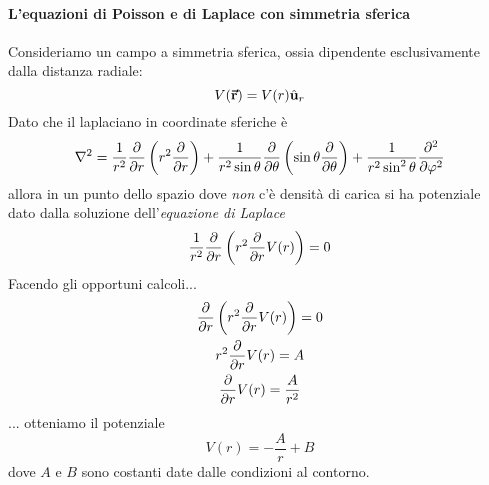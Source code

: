 \paragraph{L'equazioni di Poisson e di Laplace con simmetria sferica}\label{EquazioniPoissonSimmetriaSferica}
Consideriamo un campo a simmetria sferica, ossia dipendente esclusivamente dalla distanza radiale:
\begin{equation*}
	V(\vb*{\va{r}})=V(r)\hat{\mathbf{u}}_r
\end{equation*}
Dato che il laplaciano in coordinate sferiche è
	\begin{equation*}
		\laplacian=\frac{1}{r^2}\pdv{r}\left(r^2\pdv{r}\right)+\frac{1}{r^2\sin\theta}\pdv{\theta}\left(\sin\theta\pdv{\theta}\right)+\frac{1}{r^2\sin^2\theta}\pdv[2]{\phi}
	\end{equation*}
allora in un punto dello spazio dove \textit{non} c'è densità di carica si ha potenziale dato dalla soluzione dell'\textit{equazione di Laplace}
\begin{equation*}
	\frac{1}{r^2}\pdv{r}\left(r^2\pdv{r}V(r)\right)=0
\end{equation*}
Facendo gli opportuni calcoli...
\begin{gather*}
	\pdv{r}\left(r^2\pdv{r}V(r)\right)=0\\
	r^2\pdv{r}V(r)=A\\
	\pdv{r}V(r)=\frac{A}{r^2}\\
\end{gather*}
... otteniamo il potenziale
\begin{equation}
	V(r)=-\frac{A}{r}+B
\end{equation}
dove $A$ e $B$ sono costanti date dalle condizioni al contorno.

